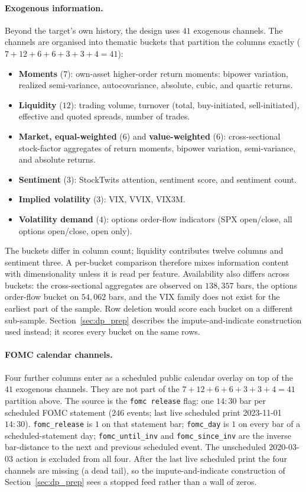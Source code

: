 \paragraph{Exogenous information.}
Beyond the target's own history, the design uses $41$ exogenous channels.
The channels are organised into thematic buckets that partition the
columns exactly ($7+12+6+6+3+3+4 = 41$):
\begin{itemize}
    \item \textbf{Moments} ($7$): own-asset higher-order return moments:
      bipower variation, realized semi-variance, autocovariance, absolute,
      cubic, and quartic returns.
    \item \textbf{Liquidity} ($12$): trading volume, turnover (total,
      buy-initiated, sell-initiated), effective and quoted spreads, number
      of trades.
    \item \textbf{Market, equal-weighted} ($6$) and \textbf{value-weighted}
      ($6$): cross-sectional stock-factor aggregates of return moments,
      bipower variation, semi-variance, and absolute returns.
    \item \textbf{Sentiment} ($3$): StockTwits attention, sentiment score,
      and sentiment count.
    \item \textbf{Implied volatility} ($3$): VIX, VVIX, VIX3M.
    \item \textbf{Volatility demand} ($4$): options order-flow indicators
      (SPX open/close, all options open/close, open only).
\end{itemize}
The buckets differ in column count; liquidity contributes twelve columns
and sentiment three. A per-bucket comparison therefore mixes information
content with dimensionality unless it is read per feature. Availability
also differs across buckets: the cross-sectional aggregates are observed
on $138{,}357$ bars, the options order-flow bucket on $54{,}062$ bars, and
the VIX family does not exist for the earliest part of the sample. Row
deletion would score each bucket on a different sub-sample.
Section~\ref{sec:dp_prep} describes the impute-and-indicate construction
used instead; it scores every bucket on the same rows.

\paragraph{FOMC calendar channels.}
Four further columns enter as a scheduled public calendar overlay on
top of the $41$ exogenous channels. They are not part of the
$7+12+6+6+3+3+4 = 41$ partition above. The source is the
\texttt{fomc release} flag: one $14{:}30$ bar per scheduled FOMC
statement ($246$ events; last live scheduled print 2023-11-01
$14{:}30$). \texttt{fomc\_release} is $1$ on that statement bar;
\texttt{fomc\_day} is $1$ on every bar of a scheduled-statement day;
\texttt{fomc\_until\_inv} and \texttt{fomc\_since\_inv} are the inverse
bar-distance to the next and previous scheduled event. The unscheduled
2020-03-03 action is excluded from all four. After the last live
scheduled print the four channels are missing (a dead tail), so the
impute-and-indicate construction of Section~\ref{sec:dp_prep} sees a
stopped feed rather than a wall of zeros.

